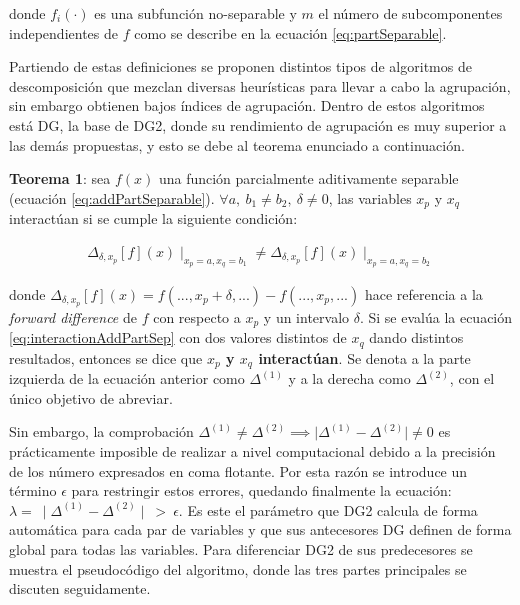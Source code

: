 donde $f_i(\cdot)$ es una subfunción no-separable y $m$ el número de subcomponentes independientes de $f$ como se describe en la ecuación \ref{eq:partSeparable}.

Partiendo de estas definiciones se proponen distintos tipos de algoritmos de descomposición que mezclan diversas heurísticas para llevar a cabo la agrupación, sin embargo obtienen bajos índices de agrupación. Dentro de estos algoritmos está DG, la base de DG2, donde su rendimiento de agrupación es muy superior a las demás propuestas, y esto se debe al teorema enunciado a continuación\cite{DG}.

\textbf{Teorema 1}: sea $f(x)$ una función parcialmente aditivamente separable (ecuación \ref{eq:addPartSeparable}). $\forall a, \ b_1 \neq b_2, \ \delta \neq 0$, las variables $x_p$ y $x_q$ interactúan si se cumple la siguiente condición:

\begin{equation}\label{eq:interactionAddPartSep}
	\begin{gathered}
		\Delta_{\delta,x_p} [f](x) \mid_{x_p = a,x_q=b_1} \neq \Delta_{\delta,x_p} [f](x) \mid_{x_p = a,x_q=b_2}
	\end{gathered}
\end{equation}

donde $\Delta_{\delta,x_p} [f](x)= f(...,x_p+\delta,...) -  f(...,x_p,...)$ hace referencia a la \textit{forward difference}\cite{DG} de $f$ con respecto a $x_p$ y un intervalo $\delta$. Si se evalúa la ecuación \ref{eq:interactionAddPartSep} con dos valores distintos de $x_q$ dando distintos resultados, entonces se dice que \textbf{$x_p$ y $x_q$ interactúan}. Se denota a la parte izquierda de la ecuación anterior como $\Delta^{(1) }$ y a la derecha como $\Delta^{(2)} $, con el único objetivo de abreviar.

Sin embargo, la comprobación $\Delta^{(1)} \neq \Delta^{(2)} \implies \mid \Delta^{(1)} - \Delta^{(2)}\mid \neq 0 $ es prácticamente imposible de realizar a nivel computacional debido a la precisión de los número expresados en coma flotante. Por esta razón se introduce un término $\epsilon$ para restringir estos errores, quedando finalmente la ecuación: $\lambda = \ \mid \Delta^{(1)} - \Delta^{(2)}\mid \ > \ \epsilon$. Es este el parámetro que DG2 calcula de forma automática para cada par de variables y que sus antecesores DG definen de forma global para todas las variables. Para diferenciar DG2 de sus predecesores se muestra el pseudocódigo del algoritmo, donde las tres partes principales se discuten seguidamente.

